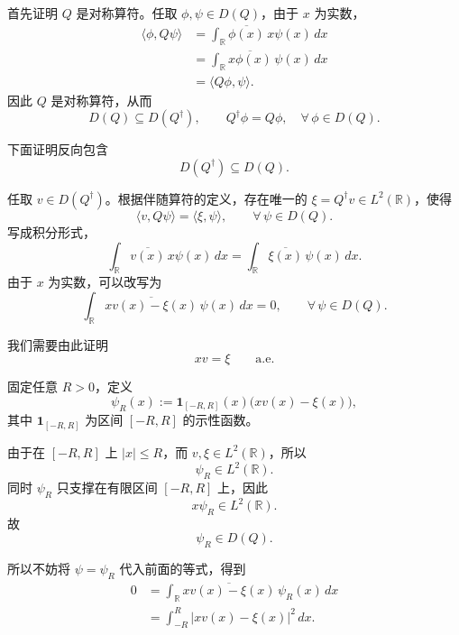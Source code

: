 \documentclass[UTF8,a4paper,11pt,openany]{ctexbook}
\begin{document}
\begin{proofblock}
首先证明 $Q$ 是对称算符。任取
$\phi,\psi\in D(Q)$，由于 $x$ 为实数，
\begin{align}
    \langle\phi,Q\psi\rangle
    &=
    \int_{\mathbb R}
    \overline{\phi(x)}\,x\psi(x)\,dx
    \nonumber\\
    &=
    \int_{\mathbb R}
    \overline{x\phi(x)}\,\psi(x)\,dx
    \nonumber\\
    &=
    \langle Q\phi,\psi\rangle.
\end{align}
因此 $Q$ 是对称算符，从而
\begin{equation}
    D(Q)\subseteq D(Q^\dagger),
    \qquad
    Q^\dagger\phi=Q\phi,
    \quad
    \forall\,\phi\in D(Q).
\end{equation}

下面证明反向包含
\[
D(Q^\dagger)\subseteq D(Q).
\]

任取 $v\in D(Q^\dagger)$。根据伴随算符的定义，存在唯一的
$\xi=Q^\dagger v\in L^2(\mathbb R)$，使得
\begin{equation}
    \langle v,Q\psi\rangle
    =
    \langle \xi,\psi\rangle,
    \qquad
    \forall\,\psi\in D(Q).
\end{equation}
写成积分形式，
\[
\int_{\mathbb R}
\overline{v(x)}\,x\psi(x)\,dx
=
\int_{\mathbb R}
\overline{\xi(x)}\,\psi(x)\,dx.
\]
由于 $x$ 为实数，可以改写为
\begin{equation}
    \int_{\mathbb R}
    \overline{xv(x)-\xi(x)}\,\psi(x)\,dx
    =
    0,
    \qquad
    \forall\,\psi\in D(Q).
\end{equation}

我们需要由此证明
\[
xv=\xi
\qquad\text{a.e.}
\]

固定任意 $R>0$，定义
\begin{equation}
    \psi_R(x)
    :=
    \mathbf 1_{[-R,R]}(x)
    \bigl(xv(x)-\xi(x)\bigr),
\end{equation}
其中 $\mathbf 1_{[-R,R]}$ 为区间 $[-R,R]$ 的示性函数。

由于在 $[-R,R]$ 上 $|x|\leq R$，而
$v,\xi\in L^2(\mathbb R)$，所以
\[
\psi_R\in L^2(\mathbb R).
\]
同时 $\psi_R$ 只支撑在有限区间 $[-R,R]$ 上，因此
\[
x\psi_R\in L^2(\mathbb R).
\]
故
\[
\psi_R\in D(Q).
\]

所以不妨将 $\psi=\psi_R$ 代入前面的等式，得到
\begin{align}
    0
    &=
    \int_{\mathbb R}
    \overline{xv(x)-\xi(x)}\,
    \psi_R(x)\,dx
    \nonumber\\
    &=
    \int_{-R}^{R}
    |xv(x)-\xi(x)|^2\,dx.
\end{align}


\end{proofblock}
\end{document}
